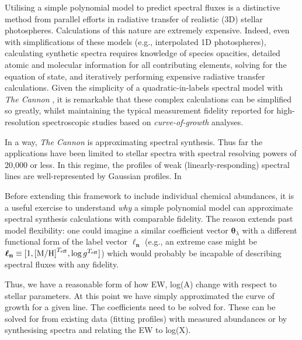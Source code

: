 \documentclass[useAMS,usenatbib]{mn2e}
\newcommand\tc{\textit{The Cannon} }
\newcommand\lv{\mathbf{\boldsymbol\ell_n}}
\newcommand\cv{{\boldsymbol\theta}_\lambda}
\begin{document}
Utilising a simple polynomial model to predict spectral fluxes is a distinctive
method from parallel efforts in radiative transfer of realistic (3D) stellar 
photospheres. Calculations of this nature are extremely expensive. Indeed, even
with simplifications of these models (e.g., interpolated 1D photospheres),
calculating synthetic spectra requires knowledge of species opacities, detailed 
atomic and molecular information for all contributing elements, solving for
the equation of state, and iteratively performing expensive radiative transfer
calculations. Given the
simplicity of a quadratic-in-labels spectral model with \tc{}, it is remarkable
that these complex calculations can be simplified so greatly, whilst maintaining
the typical measurement fidelity reported for high-resolution spectroscopic studies based on
\textit{curve-of-growth} analyses.

In a way, \tc{} is approximating spectral synthesis. Thus far the applications
have been limited to stellar spectra with spectral resolving powers of 20,000
or less. In this regime, the profiles of weak (linearly-responding) spectral lines
are well-represented by Gaussian profiles. In 


Before extending this framework to include individual chemical abundances, it is
a useful exercise to understand \textit{why} a simple polynomial model can 
approximate spectral synthesis calculations with comparable fidelity. The reason
extends past model flexibility: one could imagine a similar coefficient vector
$\cv$ with a different functional form of the label vector $\lv$ (e.g., an
extreme case might be $\lv \equiv [1, {\rm [M/H]}^{T_{\rm eff}},
\log{g}^{T_{\rm eff}}]$) which would probably be incapable of describing
spectral fluxes with any fidelity.






Thus, we have a reasonable form of how EW, log(A) change with respect to
stellar parameters. At this point we have simply approximated the curve of growth
for a given line. The coefficients need to be solved for. These can be solved for
from existing data (fitting profiles) with measured abundances or by synthesising
spectra and relating the EW to log(X).
\end{document}
